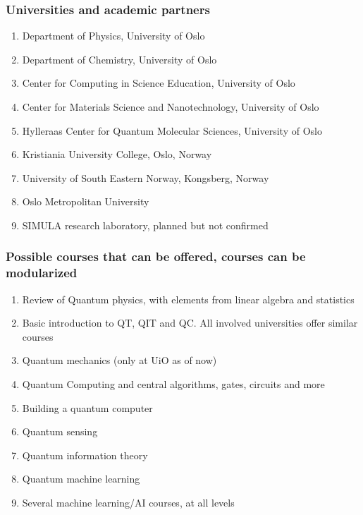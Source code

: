 \documentclass{beamer}
\begin{document}
\begin{frame}
\frametitle{Universities and academic partners}

\begin{block}{}
\begin{enumerate}
\item Department of Physics, University of Oslo

\item Department of Chemistry, University of Oslo

\item Center for Computing in Science Education, University of Oslo

\item Center for Materials Science and Nanotechnology, University of Oslo

\item Hylleraas Center for Quantum Molecular Sciences, University of Oslo

\item Kristiania University College, Oslo, Norway

\item University of South Eastern Norway, Kongsberg, Norway

\item Oslo Metropolitan University 

\item SIMULA research laboratory, planned but not confirmed
\end{enumerate}

\noindent
\end{block}
\end{frame}

\begin{frame}
\frametitle{Possible courses that can be offered, courses can be modularized}

\begin{block}{}
\begin{enumerate}
\item Review of Quantum physics, with elements from linear algebra and statistics
\item Basic introduction to QT, QIT and QC. All involved universities offer similar courses
\item Quantum mechanics (only at UiO as of now)
\item Quantum Computing and central algorithms, gates, circuits and more
\item Building a quantum computer
\item Quantum sensing
\item Quantum information theory
\item Quantum machine learning
\item Several  machine learning/AI courses, at all levels
\end{enumerate}

\end{block}
\end{frame}
\end{document}
